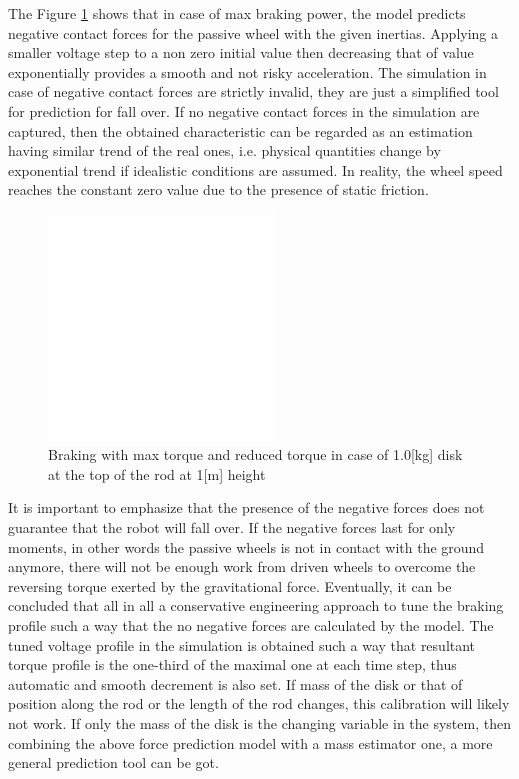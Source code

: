 \documentclass[12pt,english]{article}
\begin{document}
The Figure \ref{braking_1_0_kg_1_0_m} shows that in case of max braking power, the model predicts negative contact forces for the passive wheel with the given inertias. Applying a smaller voltage step to a non zero initial value then decreasing that of value exponentially provides a smooth and not risky acceleration. The simulation in case of negative contact forces are strictly invalid, they are just a simplified tool for prediction for fall over. If no negative contact forces in the simulation are captured, then the obtained characteristic can be regarded as an estimation having similar trend of the real ones, i.e. physical quantities change by exponential trend if idealistic conditions are assumed. In reality, the wheel speed reaches the constant zero value due to the presence of static friction.
\begin{figure}[htb!]
	\centering
	\includegraphics[height=6cm]{figures/braking_1_0_kg_1_0_m}
	\caption{Braking with max torque and reduced torque in case of 1.0[kg] disk at the top of the rod at 1[m] height}
	\label{braking_1_0_kg_1_0_m}
\end{figure}
It is important to emphasize that the presence of the negative forces does not guarantee that the robot will fall over. If the negative forces last for only moments, in other words the passive wheels is not in contact with the ground anymore, there will not be enough work from driven wheels to overcome the reversing torque exerted by the gravitational force. Eventually, it can be concluded that all in all a conservative engineering approach to tune the braking profile such a way that the no negative forces are calculated by the model. The tuned voltage profile in the simulation is obtained such a way that resultant torque profile is the one-third of the maximal one at each time step, thus automatic and smooth decrement is also set. If mass of the disk or that of position along the rod or the length of the rod changes, this calibration will likely not work. If only the mass of the disk is the changing variable in the system, then combining the above force prediction model with a mass estimator one, a more general prediction tool can be got.
\end{document}
